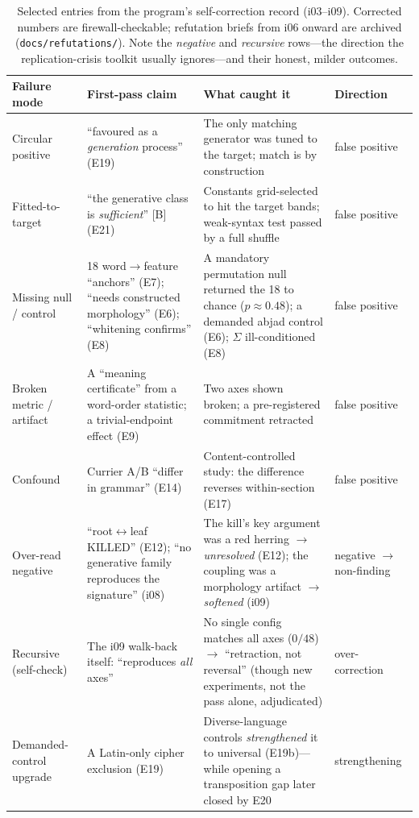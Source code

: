 \documentclass[11pt]{article}
\begin{document}
\begin{table}[t]\centering\small
\renewcommand{\arraystretch}{1.25}
\begin{tabular}{@{}p{2.5cm}p{4.4cm}p{4.2cm}p{2.2cm}@{}}
\toprule
\textbf{Failure mode} & \textbf{First-pass claim} & \textbf{What caught it} &
\textbf{Direction} \\
\midrule
Circular positive & ``favoured as a \emph{generation} process'' (E19) &
The only matching generator was tuned to the target; match is by construction &
false positive \\
Fitted-to-target & ``the generative class is \emph{sufficient}'' [B] (E21) &
Constants grid-selected to hit the target bands; weak-syntax test passed by a full shuffle &
false positive \\
Missing null / control & 18 word$\rightarrow$feature ``anchors'' (E7); ``needs constructed
morphology'' (E6); ``whitening confirms'' (E8) & A mandatory permutation null returned the 18
to chance ($p\!\approx\!0.48$); a demanded abjad control (E6); $\Sigma$ ill-conditioned (E8) &
false positive \\
Broken metric / artifact & A ``meaning certificate'' from a word-order statistic; a
trivial-endpoint effect (E9) & Two axes shown broken; a pre-registered commitment retracted &
false positive \\
Confound & Currier A/B ``differ in grammar'' (E14) & Content-controlled study: the
difference reverses within-section (E17) & false positive \\
Over-read negative & ``root$\leftrightarrow$leaf KILLED'' (E12); ``no generative family
reproduces the signature'' (i08) & The kill's key argument was a red herring $\rightarrow$
\emph{unresolved} (E12); the coupling was a morphology artifact $\rightarrow$ \emph{softened}
(i09) & negative $\rightarrow$ non-finding \\
Recursive (self-check) & The i09 walk-back itself: ``reproduces \emph{all} axes'' &
No single config matches all axes ($0/48$) $\rightarrow$ ``retraction, not reversal'' (though
new experiments, not the pass alone, adjudicated) & over-correction \\
Demanded-control upgrade & A Latin-only cipher exclusion (E19) & Diverse-language controls
\emph{strengthened} it to universal (E19b)---while opening a transposition gap later closed by
E20 & strengthening \\
\bottomrule
\end{tabular}
\caption{Selected entries from the program's self-correction record (i03--i09). Corrected
numbers are firewall-checkable; refutation briefs from i06 onward are archived
(\texttt{docs/refutations/}). Note the \emph{negative} and \emph{recursive} rows---the
direction the replication-crisis toolkit usually ignores---and their honest, milder outcomes.}
\label{tab:record}
\end{table}
\end{document}
